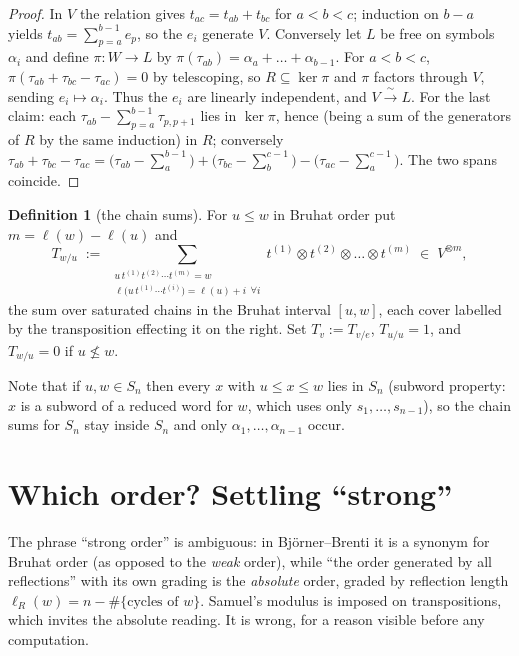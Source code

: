 \documentclass[11pt]{article}
\theoremstyle{plain}
\theoremstyle{definition}
\newtheorem{definition}[theorem]{Definition}
\DeclareMathOperator{\len}{\ell}
\begin{document}
\begin{proof}
In $V$ the relation gives $t_{ac}=t_{ab}+t_{bc}$ for $a<b<c$; induction on
$b-a$ yields $t_{ab}=\sum_{p=a}^{b-1}e_{p}$, so the $e_{i}$ generate $V$.
Conversely let $L$ be free on symbols $\alpha_{i}$ and define $\pi:W\to L$ by
$\pi(\tau_{ab})=\alpha_{a}+\dots+\alpha_{b-1}$. For $a<b<c$,
$\pi(\tau_{ab}+\tau_{bc}-\tau_{ac})=0$ by telescoping, so $R\subseteq\ker\pi$
and $\pi$ factors through $V$, sending $e_{i}\mapsto\alpha_{i}$. Thus the
$e_{i}$ are linearly independent, and $V\xrightarrow{\ \sim\ }L$.
For the last claim: each $\tau_{ab}-\sum_{p=a}^{b-1}\tau_{p,p+1}$ lies in
$\ker\pi$, hence (being a sum of the generators of $R$ by the same induction)
in $R$; conversely
$\tau_{ab}+\tau_{bc}-\tau_{ac}
=\bigl(\tau_{ab}-\sum_{a}^{b-1}\bigr)+\bigl(\tau_{bc}-\sum_{b}^{c-1}\bigr)
-\bigl(\tau_{ac}-\sum_{a}^{c-1}\bigr)$. The two spans coincide.
\end{proof}

\begin{definition}[the chain sums]\label{def:T}
For $u\le w$ in Bruhat order put $m=\len(w)-\len(u)$ and
\[
  T_{w/u}\;:=\;\sum_{\substack{u\,t^{(1)}t^{(2)}\cdots t^{(m)}=w\\[1pt]
      \len\bigl(u\,t^{(1)}\cdots t^{(i)}\bigr)=\len(u)+i\ \ \forall i}}
  t^{(1)}\otimes t^{(2)}\otimes\dots\otimes t^{(m)}\;\in\;V^{\otimes m},
\]
the sum over saturated chains in the Bruhat interval $[u,w]$, each cover
labelled by the transposition effecting it on the right. Set $T_{v}:=T_{v/e}$,
$T_{u/u}=1$, and $T_{w/u}=0$ if $u\not\le w$.
\end{definition}

Note that if $u,w\in S_{n}$ then every $x$ with $u\le x\le w$ lies in $S_{n}$
(subword property: $x$ is a subword of a reduced word for $w$, which uses only
$s_{1},\dots,s_{n-1}$), so the chain sums for $S_{n}$ stay inside $S_{n}$ and
only $\alpha_{1},\dots,\alpha_{n-1}$ occur.

\section{Which order? Settling ``strong''}\label{sec:order}

The phrase ``strong order'' is ambiguous: in Bj\"orner--Brenti it is a synonym
for Bruhat order (as opposed to the \emph{weak} order), while ``the order
generated by all reflections'' with its own grading is the \emph{absolute}
order, graded by reflection length
$\len_{R}(w)=n-\#\{\text{cycles of }w\}$. Samuel's modulus is imposed on
transpositions, which invites the absolute reading. It is wrong, for a reason
visible before any computation.
\end{document}
